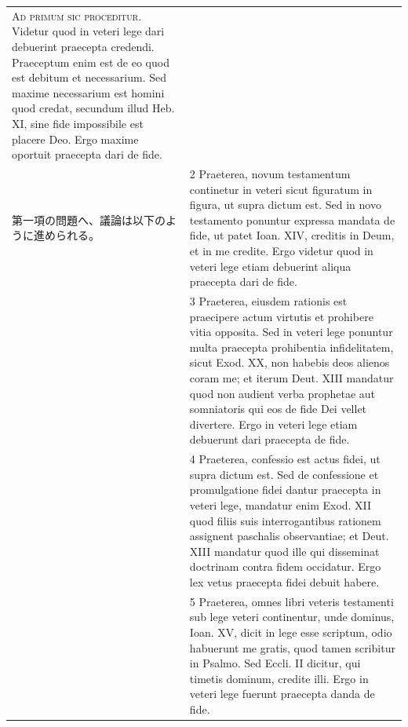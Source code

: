 \documentclass[paper=a4paper,fontsize=10pt,jafontsize=9pt,titlepage]{jlreq}
\begin{document}
\begin{longtable}{p{21em}p{21em}}
{\huge A}{\scshape d primum sic proceditur}. Videtur
quod in veteri lege dari debuerint praecepta credendi. Praeceptum enim
est de eo quod est debitum et necessarium. Sed maxime necessarium est
homini quod credat, secundum illud Heb. XI, sine fide impossibile est
placere Deo. Ergo maxime oportuit praecepta dari de fide.

\\

第一項の問題へ、議論は以下のように進められる。

&



2 Praeterea, novum testamentum
continetur in veteri sicut figuratum in figura, ut supra dictum est. Sed
in novo testamento ponuntur expressa mandata de fide, ut patet
Ioan. XIV, creditis in Deum, et in me credite. Ergo videtur quod in
veteri lege etiam debuerint aliqua praecepta dari de fide.


\\

&



3 Praeterea, eiusdem rationis est
praecipere actum virtutis et prohibere vitia opposita. Sed in veteri
lege ponuntur multa praecepta prohibentia infidelitatem, sicut Exod. XX,
non habebis deos alienos coram me; et iterum Deut. XIII mandatur quod
non audient verba prophetae aut somniatoris qui eos de fide Dei vellet
divertere. Ergo in veteri lege etiam debuerunt dari praecepta de fide.


\\

&



4 Praeterea, confessio est actus fidei,
ut supra dictum est. Sed de confessione et promulgatione fidei dantur
praecepta in veteri lege, mandatur enim Exod. XII quod filiis suis
interrogantibus rationem assignent paschalis observantiae; et Deut. XIII
mandatur quod ille qui disseminat doctrinam contra fidem occidatur. Ergo
lex vetus praecepta fidei debuit habere.


\\

&



5 Praeterea, omnes libri veteris
testamenti sub lege veteri continentur, unde dominus, Ioan. XV, dicit in
lege esse scriptum, odio habuerunt me gratis, quod tamen scribitur in
Psalmo. Sed Eccli. II dicitur, qui timetis dominum, credite illi. Ergo
in veteri lege fuerunt praecepta danda de fide.



\end{longtable}
\end{document}
